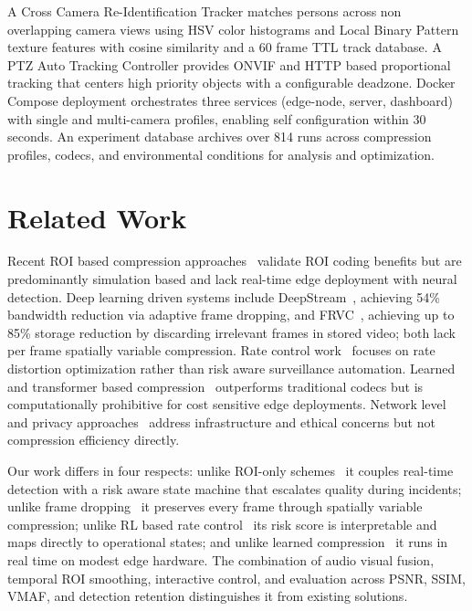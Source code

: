 \documentclass[conference]{IEEEtran}
\begin{document}
A Cross Camera Re-Identification Tracker matches persons across non overlapping camera views using HSV color histograms and Local Binary Pattern texture features with cosine similarity and a 60 frame TTL track database. A PTZ Auto Tracking Controller provides ONVIF and HTTP based proportional tracking that centers high priority objects with a configurable deadzone. Docker Compose deployment orchestrates three services (edge-node, server, dashboard) with single and multi-camera profiles, enabling self configuration within 30 seconds. An experiment database archives over 814 runs across compression profiles, codecs, and environmental conditions for analysis and optimization.

\section{Related Work}
Recent ROI based compression approaches~\cite{wang2025compression,li2024region,labiod2023region,aliouat2023region} validate ROI coding benefits but are predominantly simulation based and lack real-time edge deployment with neural detection. Deep learning driven systems include DeepStream~\cite{guo2023deepstream}, achieving 54\% bandwidth reduction via adaptive frame dropping, and FRVC~\cite{agrawal2025frvc}, achieving up to 85\% storage reduction by discarding irrelevant frames in stored video; both lack per frame spatially variable compression. Rate control work~\cite{gadot2025rlrc,rozek2025video,chuang2025adaptive} focuses on rate distortion optimization rather than risk aware surveillance automation. Learned and transformer based compression~\cite{balle2017end,minnen2018joint,lu2024transformer} outperforms traditional codecs but is computationally prohibitive for cost sensitive edge deployments. Network level and privacy approaches~\cite{islam2024sdn,kim2024privacy,zhao2025federated} address infrastructure and ethical concerns but not compression efficiency directly.

Our work differs in four respects: unlike ROI-only schemes~\cite{wang2025compression,li2024region,labiod2023region} it couples real-time detection with a risk aware state machine that escalates quality during incidents; unlike frame dropping~\cite{agrawal2025frvc} it preserves every frame through spatially variable compression; unlike RL based rate control~\cite{gadot2025rlrc} its risk score is interpretable and maps directly to operational states; and unlike learned compression~\cite{lu2024transformer} it runs in real time on modest edge hardware. The combination of audio visual fusion, temporal ROI smoothing, interactive control, and evaluation across PSNR, SSIM, VMAF, and detection retention distinguishes it from existing solutions.
\end{document}
